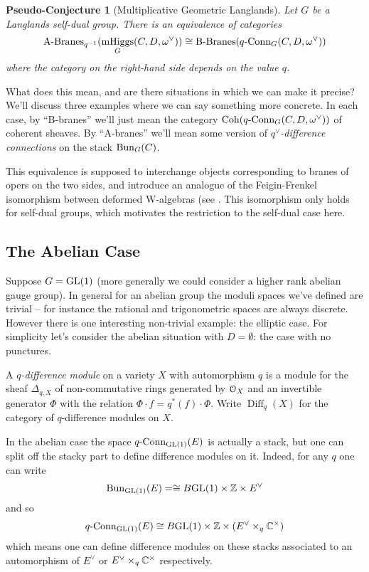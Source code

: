 \documentclass[10pt, oneside]{article}
\DeclareMathOperator{\mhiggs}{mHiggs}
\newcommand{\qconn}{q\text{-Conn}}
\DeclareMathOperator{\diff}{Diff}
\newtheorem{pseudoconj}[definition]{Pseudo-Conjecture}
\begin{document}
\begin{pseudoconj}[Multiplicative Geometric Langlands] \label{multLanglands}
Let $G$ be a Langlands self-dual group.  There is an equivalence of categories
\[\text{A-Branes}_{q^{-1}}(\mhiggs_G(C,D,\omega^\vee)) \iso \text{B-Branes}(\qconn_G(C, D, \omega^\vee))\]
where the category on the right-hand side depends on the value $q$.
\end{pseudoconj}

What does this mean, and are there situations in which we can make it precise?  We'll discuss three examples where we can say something more concrete.  In each case, by ``B-branes'' we'll just mean the category $\coh(\qconn_G(C, D, \omega^\vee))$ of coherent sheaves.  By ``A-branes'' we'll mean some version of \emph{$q^\vee$-difference connections} on the stack $\operatorname{Bun}_G(C)$.

\begin{remark}
This equivalence is supposed to interchange objects corresponding to branes of opers on the two sides, and introduce an analogue of the Feigin-Frenkel isomorphism between deformed W-algebras (see \cite{FrenkelReshetikhinSTS, STSSevostyanov}.  This isomorphism only holds for self-dual groups, which motivates the restriction to the self-dual case here.
\end{remark}

\subsection{The Abelian Case}
Suppose $G = \mathrm{GL}(1)$ (more generally we could consider a higher rank abelian gauge group).  In general for an abelian group the moduli spaces we've defined are trivial -- for instance the rational and trigonometric spaces are always discrete.  However there is one interesting non-trivial example: the elliptic case.  For simplicity let's consider the abelian situation with $D = \emptyset$: the case with no punctures.

\begin{definition}
A \emph{$q$-difference module} on a variety $X$ with automorphism $q$ is a module for the sheaf $\Delta_{q,X}$ of non-commutative rings generated by $\mathcal{O}_X$ and an invertible generator $\Phi$ with the relation $\Phi \cdot f = q^*(f) \cdot \Phi$.  Write $\diff_q(X)$ for the category of $q$-difference modules on $X$.
\end{definition}

In the abelian case the space $\qconn_{\GL(1)}(E)$ is actually a stack, but one can split off the stacky part to define difference modules on it.  Indeed, for any $q$ one can write
\[\operatorname{Bun}_{\mathrm{GL}(1)}(E) = \cong B\mathrm{GL}(1) \times \mathbb{Z} \times E^\vee\]
and so
\[\qconn_{\GL(1)}(E) \iso B\GL(1) \times \ZZ \times (E^\vee \times_q \CC^\times)\]
which means one can define difference modules on these stacks associated to an automorphism of $E^\vee$ or $E^\vee \times_q \mathbb{C}^\times$ respectively.
\end{document}
